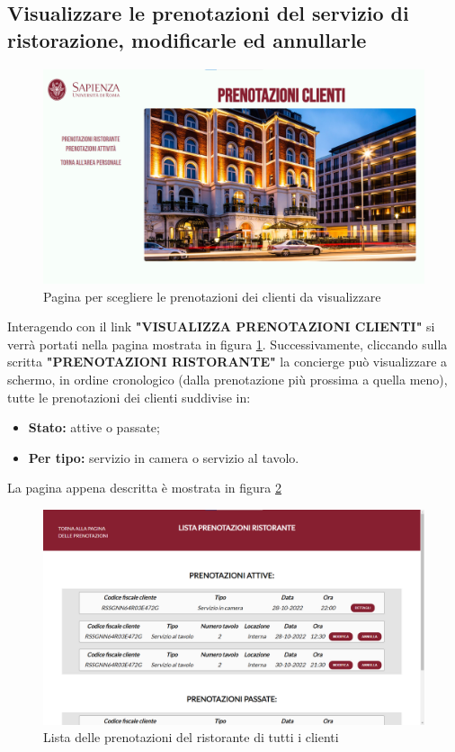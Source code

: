 \documentclass [a4paper, 12pt]{book}
\begin{document}
\subsection{Visualizzare le prenotazioni del servizio di ristorazione, modificarle ed annullarle}
\begin{figure}[!h]
\centering
\includegraphics[scale=0.3]{PrenotazioniClienti.png}
\caption{Pagina per scegliere le prenotazioni dei clienti da visualizzare}
\label{PrenotazioniClienti}
\end{figure}
Interagendo con il link \textbf{"VISUALIZZA PRENOTAZIONI CLIENTI"} si verrà portati nella pagina mostrata in figura \ref{PrenotazioniClienti}. Successivamente, cliccando sulla scritta \textbf{"PRENOTAZIONI RISTORANTE"} la concierge può visualizzare a schermo, in ordine cronologico (dalla prenotazione più prossima a quella meno), tutte le prenotazioni dei clienti suddivise in:
\begin{itemize}
\item \textbf{Stato:} attive o passate;
\item \textbf{Per tipo:} servizio in camera o servizio al tavolo.
\end{itemize} 
La pagina appena descritta è mostrata in figura \ref{PrenotazioniRistoranteStaff}\newpage
\begin{figure}[h]
\centering
\includegraphics[scale=0.3]{PrenotazioniRistoranteStaff.png}
\caption{Lista delle prenotazioni del ristorante di tutti i clienti}
\label{PrenotazioniRistoranteStaff}
\end{figure}
\end{document}
